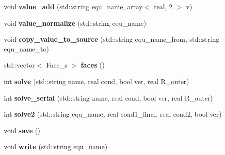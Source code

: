\begin{DoxyCompactItemize}
\item 
\hypertarget{classProb_a8dd6bf7649956711e74ccc58957186d8}{
void {\bfseries value\_\-add} (std::string equ\_\-name, array$<$ real, 2 $>$ v)}
\label{classProb_a8dd6bf7649956711e74ccc58957186d8}

\item 
\hypertarget{classProb_ad0c1ce9a1ffc181bf289aed404a2bb45}{
void {\bfseries value\_\-normalize} (std::string equ\_\-name)}
\label{classProb_ad0c1ce9a1ffc181bf289aed404a2bb45}

\item 
\hypertarget{classProb_a7bb25a9a766484c678d7e23e4b5ea4a7}{
void {\bfseries copy\_\-value\_\-to\_\-source} (std::string equ\_\-name\_\-from, std::string equ\_\-name\_\-to)}
\label{classProb_a7bb25a9a766484c678d7e23e4b5ea4a7}

\item 
\hypertarget{classProb_ac298114d98ebe5296ede77dafc3f4df3}{
std::vector$<$ Face\_\-s $>$ {\bfseries faces} ()}
\label{classProb_ac298114d98ebe5296ede77dafc3f4df3}

\item 
\hypertarget{classProb_a7224056a4b6649080d3e2deeab2faaad}{
int {\bfseries solve} (std::string name, real cond, bool ver, real R\_\-outer)}
\label{classProb_a7224056a4b6649080d3e2deeab2faaad}

\item 
\hypertarget{classProb_a2485482a64a7f4f3d7ef75ba3a4687b0}{
int {\bfseries solve\_\-serial} (std::string name, real cond, bool ver, real R\_\-outer)}
\label{classProb_a2485482a64a7f4f3d7ef75ba3a4687b0}

\item 
\hypertarget{classProb_ae50c9b74ff1590305dac1e64988a6d8b}{
int {\bfseries solve2} (std::string equ\_\-name, real cond1\_\-final, real cond2, bool ver)}
\label{classProb_ae50c9b74ff1590305dac1e64988a6d8b}

\item 
\hypertarget{classProb_a187e846a4f4eed21758efaa63ede9ec1}{
void {\bfseries save} ()}
\label{classProb_a187e846a4f4eed21758efaa63ede9ec1}

\item 
\hypertarget{classProb_ad790058d97221b21c665d550650c15ad}{
void {\bfseries write} (std::string equ\_\-name)}
\label{classProb_ad790058d97221b21c665d550650c15ad}

\end{DoxyCompactItemize}
